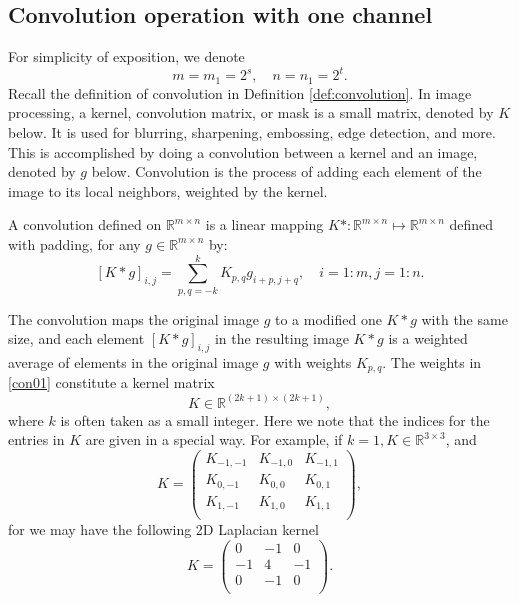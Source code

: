 \subsection{Convolution operation with one channel}
For simplicity of exposition, we denote 
\begin{equation}\label{eq:size_f}
m = m_1 = 2^{s},  \quad n = n_1 = 2^t.
\end{equation}
Recall the definition of convolution in Definition \ref{def:convolution}.  In image processing, a kernel, convolution matrix, or mask is a small matrix, denoted by $K$ below. It is used for blurring, sharpening, embossing, edge detection, and more. This is accomplished by doing a convolution between a kernel and an image, denoted by $g$ below. Convolution is the process of adding each element of the image to its local neighbors, weighted by the kernel.
\begin{definition}
A convolution defined on $\mathbb{R}^{m\times n}$ is a linear mapping 
$K\ast: \mathbb{R}^{m\times n}\mapsto \mathbb{R}^{m\times n}$ defined with padding,  
for any $g \in \mathbb{R}^{m\times n}$ by:
\begin{equation}\label{con01}
[K \ast g]_{i,j} = \sum_{p,q=-k}^k K_{p, q} g_{i + p, j + q}, \quad i=1:m, j = 1:n.
\end{equation}
\end{definition}
The convolution maps the original  image $g$ to a modified one $K\ast g$ with the same size, and each element $[K \ast g]_{i,j}$ in the resulting image $K\ast g$ is a weighted average of elements in the original image $g$ with weights $K_{p,q}$.
The weights in \eqref{con01} constitute  a kernel matrix
\begin{equation}
K \in \mathbb{R}^{(2k+1) \times (2k+1)},
\end{equation}
where $k$ is often taken as a small integer. 
Here we note that the indices for the entries in $K$ are given in a special way. 
For example, if $k=1, K\in \mathbb R^{3\times 3}$, and 
$$
K=\begin{pmatrix}
	K_{-1,-1} &K_{-1,0} &K_{-1,1} \\
	K_{0,-1} &K_{0,0} &K_{0,1} \\
	K_{1,-1} &K_{1,0} &K_{1,1} \\
	\end{pmatrix},
$$
for we may have the following 2D Laplacian kernel
\begin{equation}\label{key}
K=\begin{pmatrix}
0 &-1 &0\\
-1 &4&-1 \\
0 &-1 &0 \\
\end{pmatrix}.
\end{equation}  

